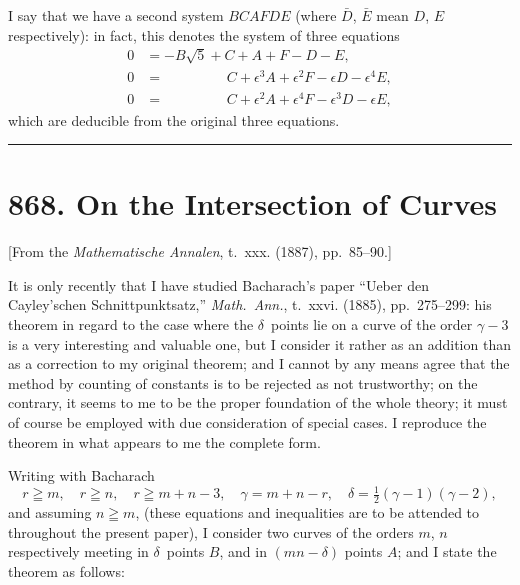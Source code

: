 \documentclass[11pt,a4paper]{article}
\theoremstyle{definition}
\begin{document}
I say that we have a second system $BCAFDE$ (where $\bar{D}$, $\bar{E}$ mean $D$, $E$ respectively): in fact, this denotes the system of three equations
\begin{align*}
0 &= -B\sqrt{5} + C + A + F - D - E, \\
0 &= \phantom{-B\sqrt{5} +}\, C + \epsilon^3 A + \epsilon^2 F - \epsilon D - \epsilon^4 E, \\
0 &= \phantom{-B\sqrt{5} +}\, C + \epsilon^2 A + \epsilon^4 F - \epsilon^3 D - \epsilon E,
\end{align*}
which are deducible from the original three equations.

\vspace{12pt}
\hrule
\vspace{12pt}

\section*{868. On the Intersection of Curves}

\begin{center}
[From the \textit{Mathematische Annalen}, t.~xxx. (1887), pp.~85--90.]
\end{center}

It is only recently that I have studied Bacharach's paper ``Ueber den Cayley'schen Schnittpunktsatz,'' \textit{Math.~Ann.}, t.~xxvi. (1885), pp.~275--299: his theorem in regard to the case where the $\delta$~points lie on a curve of the order $\gamma - 3$ is a very interesting and valuable one, but I consider it rather as an addition than as a correction to my original theorem; and I cannot by any means agree that the method by counting of constants is to be rejected as not trustworthy; on the contrary, it seems to me to be the proper foundation of the whole theory; it must of course be employed with due consideration of special cases. I reproduce the theorem in what appears to me the complete form.

Writing with Bacharach
\[r \geqq m, \quad r \geqq n, \quad r \geqq m + n - 3, \quad \gamma = m + n - r, \quad \delta = \tfrac{1}{2}(\gamma - 1)(\gamma - 2),\]
and assuming $n \geqq m$, (these equations and inequalities are to be attended to throughout the present paper), I consider two curves of the orders $m$, $n$ respectively meeting in $\delta$~points $B$, and in $(mn - \delta)$ points $A$; and I state the theorem as follows:
\end{document}
